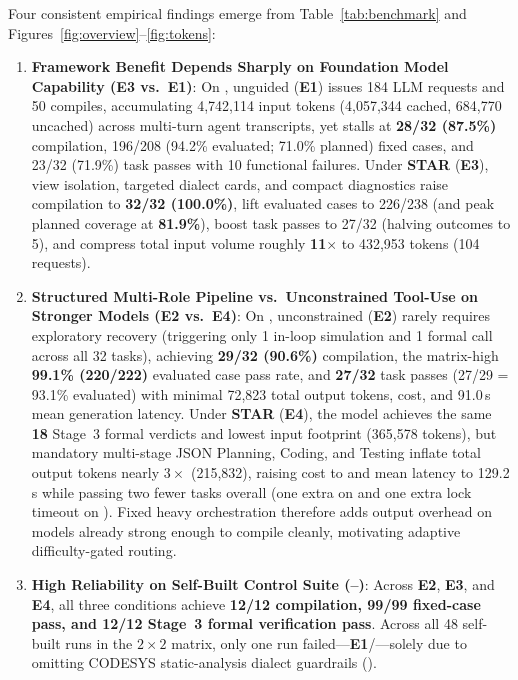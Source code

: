 Four consistent empirical findings emerge from Table~\ref{tab:benchmark} and Figures~\ref{fig:overview}--\ref{fig:tokens}:
\begin{enumerate}
  \item \textbf{Framework Benefit Depends Sharply on Foundation Model Capability (\textbf{E3} vs.\ \textbf{E1})}: On , unguided  (\textbf{E1}) issues 184 LLM requests and 50 compiles, accumulating 4,742,114 input tokens (4,057,344 cached, 684,770 uncached) across multi-turn agent transcripts, yet stalls at \textbf{28/32 (87.5\%)} compilation, 196/208 (94.2\% evaluated; 71.0\% planned) fixed cases, and 23/32 (71.9\%) task passes with 10 functional failures. Under \textbf{STAR} (\textbf{E3}), view isolation, targeted dialect cards, and compact diagnostics raise compilation to \textbf{32/32 (100.0\%)}, lift evaluated cases to 226/238 (and peak planned coverage at \textbf{81.9\%}), boost task passes to 27/32 (halving  outcomes to 5), and compress total input volume roughly \textbf{11$\times$} to 432,953 tokens (104 requests).
  \item \textbf{Structured Multi-Role Pipeline vs.\ Unconstrained Tool-Use on Stronger Models (\textbf{E2} vs.\ \textbf{E4})}: On , unconstrained  (\textbf{E2}) rarely requires exploratory recovery (triggering only 1 in-loop simulation and 1 formal call across all 32 tasks), achieving \textbf{29/32 (90.6\%)} compilation, the matrix-high \textbf{99.1\% (220/222)} evaluated case pass rate, and \textbf{27/32} task passes (27/29 = 93.1\% evaluated) with minimal 72,823 total output tokens,  cost, and 91.0\,s mean generation latency. Under \textbf{STAR} (\textbf{E4}), the model achieves the same \textbf{18} Stage~3 formal  verdicts and lowest input footprint (365,578 tokens), but mandatory multi-stage JSON Planning, Coding, and Testing inflate total output tokens nearly $3\times$ (215,832), raising cost to  and mean latency to 129.2\,s while passing two fewer tasks overall (one extra  on  and one extra lock timeout on ). Fixed heavy orchestration therefore adds output overhead on models already strong enough to compile cleanly, motivating adaptive difficulty-gated routing.
  \item \textbf{High Reliability on Self-Built Control Suite (--)}: Across \textbf{E2}, \textbf{E3}, and \textbf{E4}, all three conditions achieve \textbf{12/12 compilation, 99/99 fixed-case pass, and 12/12 Stage~3 formal verification pass}. Across all 48 self-built runs in the $2 \times 2$ matrix, only one run failed---\textbf{E1}/---solely due to omitting CODESYS static-analysis dialect guardrails ().

\end{enumerate}
